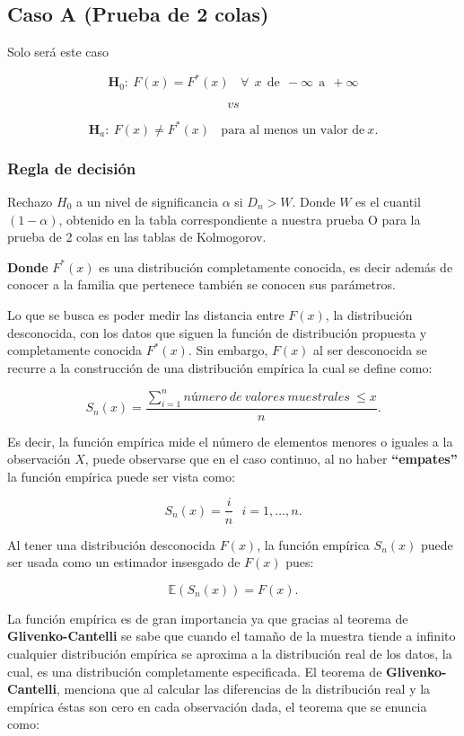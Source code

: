 \documentclass[
  a4paper,
  oneside,
  openany]{book}
\begin{document}
\hypertarget{caso-a-prueba-de-2-colas-2}{%
\subsection{Caso A (Prueba de 2 colas)}\label{caso-a-prueba-de-2-colas-2}}

Solo será este caso

\[\textbf{H}_0: \ F(x)=F^*(x) \ \ \ \ \forall \ \ x\ \  \mbox{de} \ \ -\infty \ \  \mbox{a} \ \  +\infty\]

\[vs\]

\[\textbf{H}_a: \ F(x) \neq F^*(x) \ \ \ \ \mbox{para al menos un valor de} \  x.\]

\hypertarget{regla-de-decisiuxf3n-30}{%
\subsubsection*{Regla de decisión}\label{regla-de-decisiuxf3n-30}}


Rechazo \(H_0\) a un nivel de significancia \(\alpha\) si \(D_{n}>W\). Donde \(W\) es el cuantil \((1-\alpha)\), obtenido en la tabla correspondiente a nuestra prueba O para la prueba de 2 colas en las tablas de Kolmogorov.

\textbf{Donde} \(F^*(x)\) es una distribución completamente conocida, es decir además de conocer a la familia que pertenece también se conocen sus parámetros.

Lo que se busca es poder medir las distancia entre \(F(x)\), la distribución desconocida, con
los datos que siguen la función de distribución propuesta y completamente conocida \(F^*(x)\).
Sin embargo, \(F(x)\) al ser desconocida se recurre a la construcción de una distribución empírica
la cual se define como:

\[S_{n}(x)=\frac{ \sum_{i=1}^{n}número\ de\ valores\ muestrales\ \leq x}{n}.\]

Es decir, la función empírica mide el número de elementos menores o iguales a la observación
\(X\), puede observarse que en el caso continuo, al no haber \textbf{``empates''} la función empírica puede
ser vista como:

\[S_{n}(x)=\frac{i}{n} \ \ \ i=1,\ldots,n.\]

Al tener una distribución desconocida \(F(x)\), la función empírica \(S_{n}(x)\) puede ser usada
como un estimador insesgado de \(F(x)\) pues:

\[\mathbb{E}(S_{n}(x))=F(x).\]

La función empírica es de gran importancia ya que gracias al teorema de \textbf{Glivenko-Cantelli} se sabe que cuando el tamaño de la muestra tiende a infinito cualquier distribución empírica se aproxima a la distribución real de los datos, la cual, es una distribución completamente especificada. El teorema de \textbf{Glivenko-Cantelli}, menciona que al calcular las diferencias de la distribución real y la empírica éstas son cero en cada observación dada, el teorema que se enuncia como:
\end{document}
